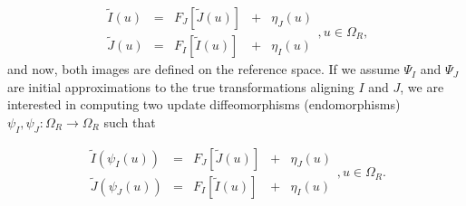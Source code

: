 \documentclass[11pt]{article}
\begin{document}
\begin{equation}\label{eq:SyNEM_gom_warped}
    \begin{array}{ccccc}
        \tilde{I}(u) &=& F_{J}[\tilde{J}(u)] &+& \eta_{J}(u)\\
        \tilde{J}(u) &=& F_{I}[\tilde{I}(u)] &+& \eta_{I}(u)
    \end{array}, u\in\Omega_{R},
\end{equation}
and now, both images are defined on the reference space. If we assume $\Psi_{I}$ and $\Psi_{J}$ are initial approximations to the true transformations
aligning $I$ and $J$, we are interested in computing two update diffeomorphisms (endomorphisms) \hbox{$\psi_{I}, \psi_{J} : \Omega_{R} \rightarrow \Omega_{R}$} such that

\begin{equation}\label{eq:SyNEM_gom_update}
    \begin{array}{ccccc}
    	\tilde{I}(\psi_{I}(u)) &=& F_{J}[\tilde{J}(u)] &+& \eta_{J}(u)\\
        \tilde{J}(\psi_{J}(u)) &=& F_{I}[\tilde{I}(u)] &+& \eta_{I}(u)
    \end{array}, u\in\Omega_{R}.
\end{equation}
\end{document}
